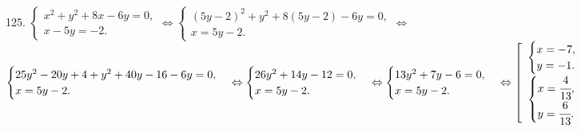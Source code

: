 125. $\begin{cases} x^2+y^2+8x-6y=0,\\ x-5y=-2.\end{cases}\Leftrightarrow
\begin{cases} (5y-2)^2+y^2+8(5y-2)-6y=0,\\ x=5y-2.\end{cases}\Leftrightarrow$\\$
\begin{cases} 25y^2-20y+4+y^2+40y-16-6y=0,\\ x=5y-2.\end{cases}\Leftrightarrow
\begin{cases} 26y^2+14y-12=0,\\ x=5y-2.\end{cases}\Leftrightarrow
\begin{cases} 13y^2+7y-6=0,\\ x=5y-2.\end{cases}\Leftrightarrow
\left[\begin{array}{l}\begin{cases}x=-7,\\y=-1.\end{cases}\\
\begin{cases}x=\cfrac{4}{13},\\y=\cfrac{6}{13}.\end{cases}\end{array}\right.$
\newpage
